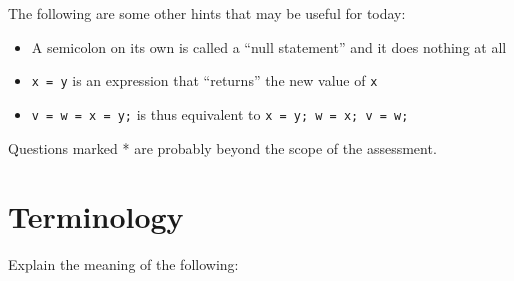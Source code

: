 \documentclass[a4paper,12pt]{article}
\begin{document}
The following are some other hints that may be useful for today:

\begin{itemize}
	\item A semicolon on its own is called a ``null statement'' and
	      it does nothing at all
	\item \texttt{x = y} is an expression that ``returns''
	      the new value of \texttt{x}
	\item \texttt{v = w = x = y;} is thus equivalent to
	      \texttt{x = y; w = x; v = w;}
\end{itemize}

Questions marked * are probably beyond the scope of the assessment.

\newpage

\section{Terminology}

Explain the meaning of the following:
\end{document}
